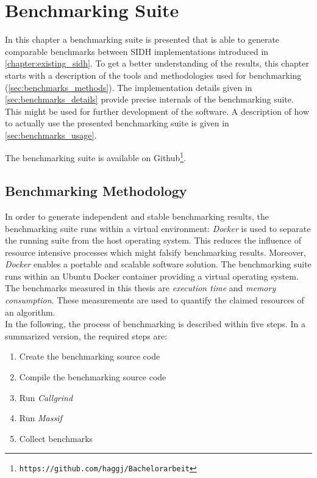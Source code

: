 \chapter{Benchmarking Suite}\label{chapter:benchmarking_suite}
In this chapter a benchmarking suite is presented that is able to generate comparable benchmarks between \gls{SIDH} implementations introduced in \autoref{chapter:existing_sidh}. To get a better understanding of the results, this chapter starts with a  description of the tools and methodologies used for benchmarking (\autoref{sec:benchmarks_methods}). The implementation details given in \autoref{sec:benchmarks_details} provide precise internals of the benchmarking suite. This might be used for further development of the software. A description of how to actually use the presented benchmarking suite is given in \autoref{sec:benchmarks_usage}.

The benchmarking suite is available on Github\footnote{\texttt{https://github.com/haggj/Bachelorarbeit}}.

\section{Benchmarking Methodology}\label{sec:benchmarks_methods}
In order to generate independent and stable benchmarking results, the benchmarking suite runs within a virtual environment: \textit{Docker} is used to separate the running suite from the host operating system. This reduces the influence of resource intensive processes which might falsify benchmarking results. Moreover, \textit{Docker} enables a portable and scalable software solution. The benchmarking suite runs within an Ubuntu Docker container providing a virtual operating system.\\
The benchmarks measured in this thesis are \textit{execution time} and \textit{memory consumption}. These measurements are used to quantify the claimed resources of an algorithm. 
\\
In the following, the process of benchmarking is described within five steps. In a summarized version, the required steps are:

\begin{enumerate}
  \itemsep0em 
  \item Create the benchmarking source code
  \item Compile the benchmarking source code
  \item Run \textit{Callgrind}
  \item Run \textit{Massif}
  \item Collect benchmarks
\end{enumerate}

